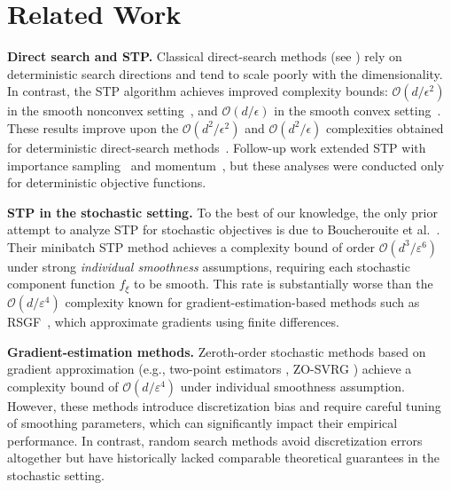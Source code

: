 \documentclass[twoside]{article}
\theoremstyle{plain}
\theoremstyle{definition}
\theoremstyle{remark}
\def\cO{{\mathcal{O}}}
\begin{document}
\section{Related Work}

\textbf{Direct search and STP.}  
Classical direct-search methods (see \cite{conn2009introduction,vicente2013worst}) rely on deterministic search directions and tend to scale poorly with the dimensionality. In contrast, the STP algorithm achieves improved complexity bounds: $\mathcal{O}(d/\epsilon^2)$ in the smooth nonconvex setting~\cite{bergou2020stochastic}, and $\mathcal{O}(d/\epsilon)$ in the smooth convex setting~\cite{kadi2025on}. These results improve upon the $\mathcal{O}(d^2/\epsilon^2)$ and $\mathcal{O}(d^2/\epsilon)$ complexities obtained for deterministic direct-search methods~\cite{vicente2013worst,konevcny2014simple}. Follow-up work extended STP with importance sampling~\cite{bibi2020stochastic} and momentum~\cite{gorbunov2020stochastic}, but these analyses were conducted only for deterministic objective functions.

  

\textbf{STP in the stochastic setting.}  
To the best of our knowledge, the only prior attempt to analyze STP for stochastic objectives is due to Boucherouite et al.~\cite{boucherouite2024mistp}. Their minibatch STP method achieves a complexity bound of order $\mathcal{O}(d^3/\varepsilon^6)$ under strong \emph{individual smoothness} assumptions, requiring each stochastic component function $f_\xi$ to be smooth. This rate is substantially worse than the $\mathcal{O}(d/\varepsilon^4)$ complexity known for gradient-estimation-based methods such as RSGF~\cite{ghadimi2013stochastic}, which approximate gradients using finite differences.


\textbf{Gradient-estimation methods.}  
Zeroth-order stochastic methods based on gradient approximation (e.g., two-point estimators 
\cite{ghadimi2013stochastic}, ZO-SVRG \cite{liu2018zeroth}) achieve a complexity bound of 
$\cO(d/\varepsilon^4)$ under individual smoothness assumption.  However, these methods introduce discretization bias and require careful tuning of smoothing parameters, which can significantly impact their empirical performance. In contrast, random search methods avoid discretization errors altogether but have historically lacked comparable theoretical guarantees in the stochastic setting.
\end{document}
